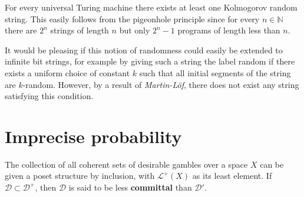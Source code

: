     \begin{property}
        For every universal Turing machine there exists at least one Kolmogorov random string. This easily follows from the pigeonhole principle since for every $n\in\mathbb{N}$ there are $2^n$ strings of length $n$ but only $2^n-1$ programs of length less than $n$.
    \end{property}

    It would be pleasing if this notion of randomness could easily be extended to infinite bit strings, for example by giving such a string the label random if there exists a uniform choice of constant $k$ such that all initial segments of the string are $k$-random. However, by a result of \textit{Martin-L\"of}, there does not exist any string satisfying this condition.

\section{Imprecise probability}

    \begin{property}
        The collection of all coherent sets of desirable gambles over a space $X$ can be given a poset structure by inclusion, with $\mathcal{L}^+(X)$ as its least element. If $\mathcal{D}\subset\mathcal{D}^+$, then $\mathcal{D}$ is said to be less \textbf{committal} than $\mathcal{D}'$.
    \end{property}


